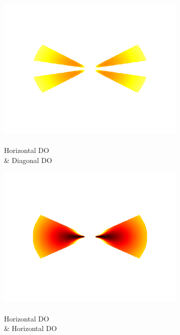 \documentclass[journal,onecolumn]{IEEEtran}
\begin{document}
\begin{figure}[h]
\begin{subfigure}[b]{0.2\textwidth}
    \end{subfigure}%
    \begin{subfigure}[b]{0.2\textwidth}
            \centering
            \captionsetup{justification=centering}
            \includegraphics[width=.85\linewidth]{j_3_2}
            \caption{\\ Horizontal DO \\ \& Diagonal DO}
    \end{subfigure}%
    \begin{subfigure}[b]{0.2\textwidth}
            \centering
            \captionsetup{justification=centering}
            \includegraphics[width=.85\linewidth]{j_3_3}
            \caption{\\ Horizontal DO \\ \& Horizontal DO}
    \end{subfigure}
    \begin{subfigure}[b]{0.2\textwidth}
            \centering
            \captionsetup{justification=centering}

\end{subfigure}
\end{figure}
\end{document}
